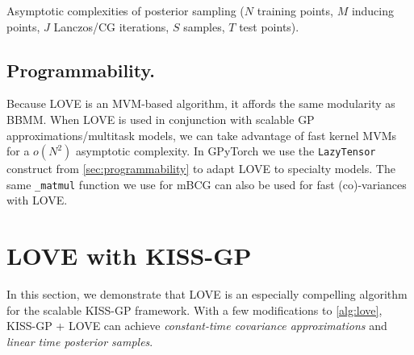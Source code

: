 \begin{table*}[t!]
  \caption[Asymptotic complexities of posterior sampling with LOVE + KISS-GP versus other methods.]{
    Asymptotic complexities of posterior sampling
		($N$ training points, $M$ inducing points, $J$ Lanczos/CG iterations, $S$ samples, $T$ test points).
    \label{tab:running_times_sampling}
  }
  \vspace{0.5ex}
  \centering
  \resizebox{\textwidth}{!}{%
    
  }
  \vspace{-2ex}
\end{table*}


\subsection{Programmability.}

Because LOVE is an MVM-based algorithm, it affords the same modularity as BBMM.
When LOVE is used in conjunction with scalable GP approximations/multitask models, we can take advantage of fast kernel MVMs for a $o(N^2)$ asymptotic complexity.
In GPyTorch we use the {\tt LazyTensor} construct from \cref{sec:programmability} to adapt LOVE to specialty models.
The same {\tt \_matmul} function we use for mBCG can also be used for fast (co)-variances with LOVE.





\section{LOVE with KISS-GP}
\label{sec:love_method_kissgp}



In this section, we demonstrate that LOVE is an especially compelling algorithm for the scalable KISS-GP framework.
With a few modifications to \cref{alg:love}, KISS-GP + LOVE can achieve \emph{constant-time covariance approximations} and \emph{linear time posterior samples}.

